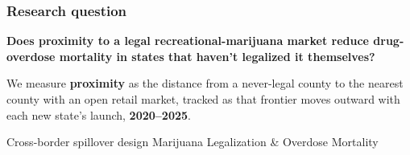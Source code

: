 \documentclass[aspectratio=169,11pt]{beamer}
\title{}
\author{}
\date{}
\begin{document}
\begin{frame}
\frametitle{Research question}
\vspace{0.6cm}
{\Large\bfseries Does proximity to a legal recreational-marijuana market reduce drug-overdose mortality in states that haven't legalized it themselves?}

\vspace{1cm}
\begin{block}{}
\small We measure \textbf{proximity} as the distance from a never-legal county to the nearest county with an open retail market, tracked as that frontier moves outward with each new state's launch, \textbf{2020--2025}.
\end{block}

\vfill
{\scriptsize\color{inksoft} Cross-border spillover design \hfill Marijuana Legalization \& Overdose Mortality}
\end{frame}
\end{document}

